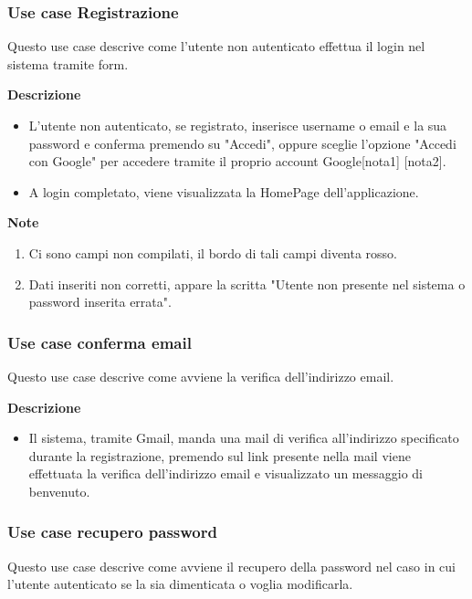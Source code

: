 \documentclass[a4paper,12pt]{article}
\begin{document}
\subsubsection*{Use case Registrazione}

Questo use case descrive come l'utente non autenticato effettua il login nel sistema tramite form.

\textbf {Descrizione}
\begin{itemize} \setlength\itemsep{0.01em}
\item L'utente non autenticato, se registrato, inserisce username o email e la sua password e conferma premendo su "Accedi", oppure sceglie l'opzione "Accedi con Google" per accedere tramite il proprio account Google[nota1] [nota2].
\item A login completato, viene visualizzata la HomePage dell'applicazione.
\end{itemize}

\textbf{Note}
\begin{enumerate} \setlength\itemsep{0.01em}
\item Ci sono campi non compilati, il bordo di tali campi diventa rosso.
\item Dati inseriti non corretti, appare la scritta "Utente non presente nel sistema o password inserita errata".
\end{enumerate}

\subsubsection*{Use case conferma email}

Questo use case descrive come avviene la verifica dell'indirizzo email.

\textbf{Descrizione}
\begin{itemize} \setlength\itemsep{0.01em}
\item Il sistema, tramite Gmail, manda una mail di verifica all'indirizzo specificato durante la registrazione, premendo sul link presente nella mail viene effettuata la verifica dell'indirizzo email e visualizzato un messaggio di benvenuto.
\end{itemize}



\subsubsection*{Use case recupero password}

Questo use case descrive come avviene il recupero della password nel caso in cui l'utente autenticato se la sia dimenticata o voglia modificarla.
\end{document}

